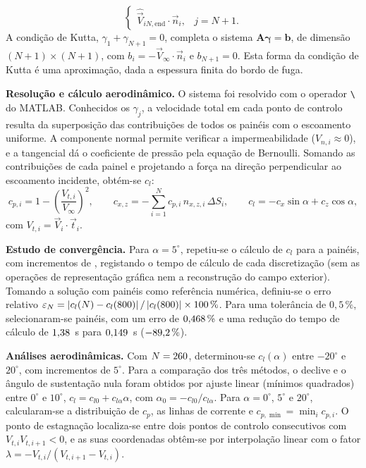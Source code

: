 \begin{etapas}
\begin{equation}
\begin{cases}
      \hat{\vec{V}}_{iN,\mathrm{end}}\cdot\vec{n}_i, & j=N+1.
    \end{cases}
    \label{eq:coeficientes_influencia}
  \end{equation}
  A condição de Kutta, $\gamma_1+\gamma_{N+1}=0$, completa o sistema
  $\mathbf{A}\boldsymbol{\gamma}=\mathbf{b}$, de dimensão
  $(N+1)\times(N+1)$, com $b_i=-\vec{V}_\infty\cdot\vec{n}_i$ e $b_{N+1}=0$.
  Esta forma da condição de Kutta é uma aproximação, dada a espessura finita
  do bordo de fuga.
  \item \textbf{Resolução e cálculo aerodinâmico.} O sistema foi resolvido
  com o operador \texttt{\textbackslash} do MATLAB. Conhecidos os $\gamma_j$,
  a velocidade total em cada ponto de controlo resulta da superposição das
  contribuições de todos os painéis com o escoamento uniforme. A componente
  normal permite verificar a impermeabilidade ($V_{n,i}\approx0$), e a
  tangencial dá o coeficiente de pressão pela equação de Bernoulli. Somando
  as contribuições de cada painel e projetando a força na direção
  perpendicular ao escoamento incidente, obtém-se $c_l$:
  \begin{equation}
    c_{p,i}=1-\left(\frac{V_{t,i}}{V_\infty}\right)^2, \qquad
    c_{x,z}=-\sum_{i=1}^{N} c_{p,i}\,n_{x,z,i}\,\Delta S_i, \qquad
    c_l=-c_x\sin\alpha+c_z\cos\alpha ,
    \label{eq:coeficiente_sustentacao}
  \end{equation}
  com $V_{t,i}=\vec{V}_i\cdot\vec{t}_i$.
  \item \textbf{Estudo de convergência.} Para $\alpha=5^\circ$, repetiu-se o
  cálculo de $c_l$ para \NMinTestePaineis{} a \NRefPaineis{} painéis, com incrementos de \PassoTestePaineis{}, registando o
  tempo de cálculo de cada discretização (sem as operações de representação
  gráfica nem a reconstrução do campo exterior). Tomando a solução com \NRefPaineis{}
  painéis como referência numérica, definiu-se o erro relativo
  $\varepsilon_N=\left|c_l(N)-c_l(800)\right|/\left|c_l(800)\right|\times100\,\%$.
  Para uma tolerância de $0{,}5\,\%$, selecionaram-se \NPaineis{} painéis, com um
  erro de $\Resultado[3]{\ErroConvergenciaPaineis}\,\%$ e uma redução do tempo de cálculo de $\Resultado{\TempoRefPaineis}$~s para
  $\Resultado[3]{\TempoConvergenciaPaineis}$~s ($-\Resultado[1]{\ReducaoTempoPaineis}\,\%$).
  \item \textbf{Análises aerodinâmicas.} Com $N=260$, determinou-se
  $c_l(\alpha)$ entre $-20^\circ$ e $20^\circ$, com incrementos de $5^\circ$.
  Para a comparação dos três métodos, o declive e o ângulo de sustentação
  nula foram obtidos por ajuste linear (mínimos quadrados) entre
  $0^\circ$ e $10^\circ$,
  $c_l=c_{l0}+c_{l\alpha}\alpha$, com $\alpha_0=-c_{l0}/c_{l\alpha}$. Para
  $\alpha=0^\circ$, $5^\circ$ e $20^\circ$, calcularam-se a distribuição de
  $c_p$, as linhas de corrente e $c_{p,\min}=\min_i c_{p,i}$. O ponto de
  estagnação localiza-se entre dois pontos de controlo consecutivos com
  $V_{t,i}V_{t,i+1}<0$, e as suas coordenadas obtêm-se por interpolação
  linear com o fator $\lambda=-V_{t,i}/(V_{t,i+1}-V_{t,i})$.
\end{etapas}


